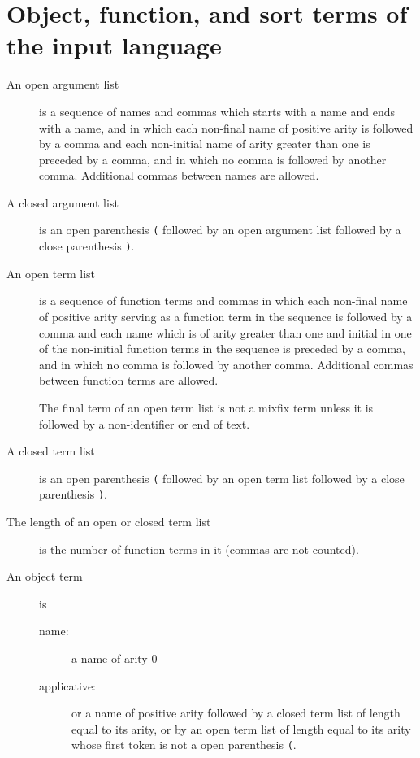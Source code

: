 \documentclass[12pt]{article}
\begin{document}
\newpage

\section{Object, function, and sort terms of the input language}

\begin{description}

\item [An open argument list]  is a sequence of names and commas which starts with a name and ends with a name, and in which each non-final name of positive arity
is followed by a comma and each non-initial name of arity greater than one  is preceded by a comma, and in which no comma is followed by another comma.  Additional commas
between names are allowed.

\item [A closed argument list] is an open parenthesis \verb|(| followed by an open argument list followed by a close parenthesis \verb|)|.

\item [An open term list]  is a sequence of function terms and commas  in which each non-final name of positive arity serving as a function term in the sequence
is followed by a comma and each name which is of arity greater than one  and initial in one of the non-initial function terms in the sequence  is preceded by a comma, and in which no comma is followed by another comma.  Additional commas between function terms are allowed.

The final term of an open term list is not a mixfix term unless it is followed by a non-identifier or end of text.

\item [A closed term list] is an open parenthesis \verb|(| followed by an open term list followed by a close parenthesis \verb|)|.

\item [The length of an open or closed term list] is the number of function terms in it (commas are not counted).

\item [An object term] is 

\begin{description}

\item[name:]   a name of arity 0 

\item[applicative:]   or a name of positive arity followed by a closed term list of length equal to its arity, or by an open term list of length equal to its arity whose first token is not a open parenthesis \verb|(|. 


\end{description}
\end{description}
\end{document}
